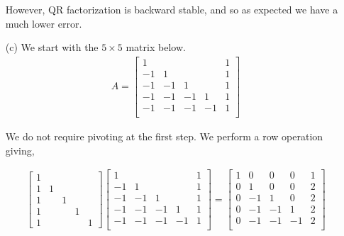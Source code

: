 \documentclass[10pt]{article}
\begin{document}
\begin{solution}[Solution]
\begin{enumerate}
        However, QR factorization is backward stable, and so as expected we have a much lower error.


    \item[(c)] We start with the \( 5\times 5 \) matrix below.
    {\footnotesize
    \begin{align*}
        A = 
        \left[\begin{array}{rrrrr}
            1 &&&&1\\
            -1 & 1 &&&1 \\
            -1 & -1 & 1&&1 \\
            -1 & -1 & -1 & 1 & 1\\
            -1 & -1 & -1 & -1 & 1\\
        \end{array}\right]
    \end{align*}
        }

    We do not require pivoting at the first step. We perform a row operation giving,

    {\footnotesize
    \begin{align*}
        \left[\begin{array}{rrrrr}
            1 \\
            1 & 1 \\
            1 & & 1 \\
            1 & & & 1 \\
            1 & & & & 1 
        \end{array}\right]
         \left[\begin{array}{rrrrr}
            1 &&&&1\\
            -1 & 1 &&&1 \\
            -1 & -1 & 1&&1 \\
            -1 & -1 & -1 & 1 & 1\\
            -1 & -1 & -1 & -1 & 1\\
        \end{array}\right]
       =
        \left[\begin{array}{ccccc}
            1 & 0 & 0 & 0 & 1 \\
            0 & 1 & 0 & 0 & 2 \\
            0 & -1 & 1 & 0 & 2 \\
            0 & -1 & -1 & 1 & 2 \\
            0 & -1 & -1 & -1 & 2 \\
        \end{array}\right]
    \end{align*}
    }


\end{enumerate}
\end{solution}
\end{document}
